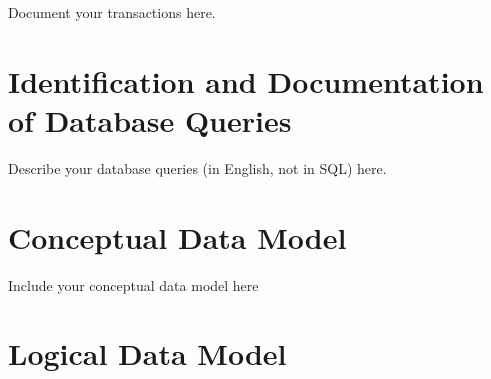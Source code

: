 \documentclass[11pt]{article}
\begin{document}

Document your transactions here.




\section{Identification and Documentation of Database Queries} \label{sec:queries}



Describe your database queries (in English, not in SQL) here.




\section{Conceptual Data Model} \label{sec:er}


Include your conceptual data model here



\section{Logical Data Model} \label{sec:logical}

\end{document}
